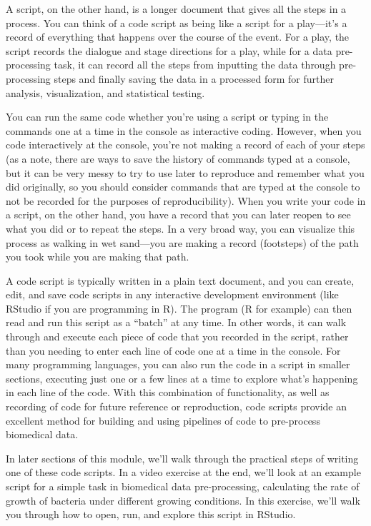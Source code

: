 \documentclass[]{tufte-book}
\begin{document}
A script, on the other hand, is a longer document that gives all the steps in a
process. You can think of a code script as being like a script for a play---it's
a record of everything that happens over the course of the event. For a play,
the script records the dialogue and stage directions for a play, while for a
data pre-processing task, it can record all the steps from inputting the data
through pre-processing steps and finally saving the data in a processed form for
further analysis, visualization, and statistical testing.

You can run the same code whether you're using a script or typing in the
commands one at a time in the console as interactive coding. However, when you
code interactively at the console, you're not making a record of each of your
steps (as a note, there are ways to save the history of commands typed at a
console, but it can be very messy to try to use later to reproduce and remember
what you did originally, so you should consider commands that are typed at the
console to not be recorded for the purposes of reproducibility). When you write
your code in a script, on the other hand, you have a record that you can
later reopen to see what you did or to repeat the steps. In a very broad way,
you can visualize this process as walking in wet sand---you are making a record
(footsteps) of the path you took while you are making that path.

A code script is typically written in a plain text document, and you can create,
edit, and save code scripts in any interactive development environment (like
RStudio if you are programming in R). The program (R for example) can then read
and run this script as a ``batch'' at any time. In other words, it can walk
through and execute each piece of code that you recorded in the script, rather
than you needing to enter each line of code one at a time in the console. For
many programming languages, you can also run the code in a script in smaller
sections, executing just one or a few lines at a time to explore what's
happening in each line of the code. With this combination of functionality, as
well as recording of code for future reference or reproduction, code scripts
provide an excellent method for building and using pipelines of code to
pre-process biomedical data.

In later sections of this module, we'll walk through the practical steps of
writing one of these code scripts. In a video exercise at the end, we'll look at
an example script for a simple task in biomedical data pre-processing,
calculating the rate of growth of bacteria under different growing conditions.
In this exercise, we'll walk you through how to open, run, and explore this
script in RStudio.
\end{document}
